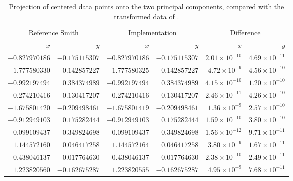 \begin{table}[H]
    \centering
    \begin{tabular}{rrrrrr}
        \toprule
        \multicolumn{2}{c}{Reference Smith} & \multicolumn{2}{c}{Implementation} & \multicolumn{2}{c}{Difference} \\
        \cmidrule(lr){1-2} \cmidrule(lr){3-4} \cmidrule(lr){5-6}
        $x$ & $y$ & $x$ & $y$ & $x$ & $y$ \\
        \midrule
        $-0.827970186$ & $-0.175115307$ & $-0.827970186$ & $-0.175115307$ & $2.01 \times 10^{-10}$ & $4.69 \times 10^{-11}$ \\
         $1.777580330$ &  $0.142857227$ &  $1.777580325$ &  $0.142857227$ & $4.72 \times 10^{-9}$  & $4.56 \times 10^{-10}$ \\
        $-0.992197494$ &  $0.384374989$ & $-0.992197494$ &  $0.384374989$ & $4.15 \times 10^{-10}$ & $1.20 \times 10^{-10}$ \\
        $-0.274210416$ &  $0.130417207$ & $-0.274210416$ &  $0.130417207$ & $2.46 \times 10^{-11}$ & $4.26 \times 10^{-10}$ \\
        $-1.675801420$ & $-0.209498461$ & $-1.675801419$ & $-0.209498461$ & $1.36 \times 10^{-9}$  & $2.57 \times 10^{-10}$ \\
        $-0.912949103$ &  $0.175282444$ & $-0.912949103$ &  $0.175282444$ & $1.59 \times 10^{-10}$ & $3.80 \times 10^{-10}$ \\
         $0.099109437$ & $-0.349824698$ &  $0.099109437$ & $-0.349824698$ & $1.56 \times 10^{-12}$ & $9.71 \times 10^{-11}$ \\
         $1.144572160$ &  $0.046417258$ &  $1.144572164$ &  $0.046417258$ & $3.80 \times 10^{-9}$  & $1.67 \times 10^{-11}$ \\
         $0.438046137$ &  $0.017764630$ &  $0.438046137$ &  $0.017764630$ & $2.38 \times 10^{-10}$ & $2.49 \times 10^{-11}$ \\
         $1.223820560$ & $-0.162675287$ &  $1.223820555$ & $-0.162675287$ & $4.95 \times 10^{-9}$  & $7.68 \times 10^{-11}$ \\
        \bottomrule
    \end{tabular}
    \caption{Projection of centered data points onto the two principal components,
    compared with the transformed data of \citet{smith2002}.}
    \label{tab:checkScores}
\end{table}

